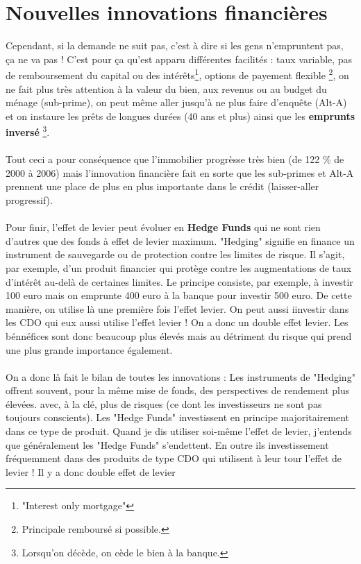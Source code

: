 \section{Nouvelles innovations financières}
Cependant, si la demande ne suit pas, c'est à dire si les gens n'empruntent pas, ça ne va pas ! C'est pour ça qu'est apparu différentes facilités : taux variable, pas de remboursement du capital ou des intérêts\footnote{"Interest only mortgage"}, options de payement flexible \footnote{Principale remboursé si possible.}, on ne fait plus très attention à la valeur du bien, aux revenus ou au budget du ménage (sub-prime), on peut même aller jusqu'à ne plus faire d'enquête (Alt-A) et on instaure les prêts de longues durées (40 ans et plus) ainsi que les \textbf{emprunts inversé} \footnote{Lorsqu'on décède, on cède le bien à la banque.}. 
\\\\
Tout ceci a pour conséquence que l'immobilier progrèsse très bien (de 122 \% de 2000 à 2006) mais l'innovation financière fait en sorte que les sub-primes et Alt-A prennent une place de plus en plus importante dans le crédit (laisser-aller progressif). 
\\\\
Pour finir, l'effet de levier peut évoluer en \textbf{Hedge Funds} qui ne sont rien d'autres que des fonds à effet de levier maximum. "Hedging" signifie en finance un instrument de sauvegarde ou de protection contre les limites de risque. Il s'agit, par exemple, d'un produit financier qui protège contre les augmentations de taux d'intérêt au-delà de certaines limites. Le principe consiste, par exemple, à investir 100 euro mais on emprunte 400 euro à la banque pour investir 500 euro. De cette manière, on utilise là une première fois l'effet levier. On peut aussi iinvestir dans les CDO qui eux aussi utilise l'effet levier ! On a donc un double effet levier. Les bénnéfices sont donc beaucoup plus élevés mais au détriment du risque qui prend une plus grande importance également. 
\\\\
On a donc là fait le bilan de toutes les innovations : 
 Les instruments de "Hedging" offrent souvent, pour la même mise de fonds, des perspectives de rendement plus élevées. avec, à la clé, plus de risques (ce dont les investisseurs ne sont pas toujours conscients).
Les "Hedge Funds" investissent en principe majoritairement dans ce type de produit.
Quand je dis utiliser soi-même l'effet de levier, j'entends que généralement les "Hedge Funds" s'endettent. En outre ils investissement fréquemment dans des produits de type CDO qui utilisent à leur tour l'effet de levier ! Il y a donc double effet de levier
